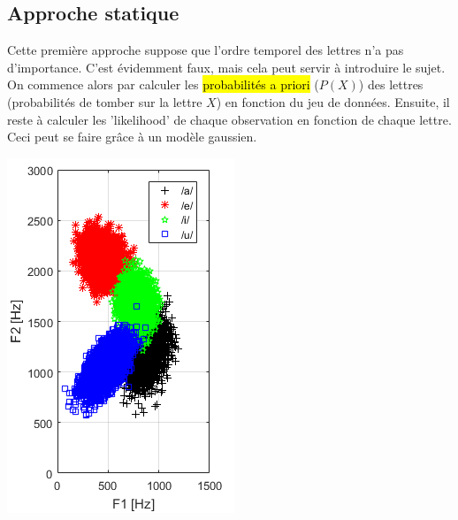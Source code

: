 \documentclass[letterpaper, 12pt]{article}
\newcommand{\alinea}{
\hspace*{0.5cm}}
\begin{document}
		\subsection{Approche statique}
			\begin{minipage}{0.75\textwidth}
				\alinea Cette première approche suppose que l'ordre temporel des lettres n'a pas d'importance. C'est évidemment faux,
				mais cela peut servir à introduire le sujet. On commence alors par calculer les \hl{probabilités a priori} ($P(X)$) des
				lettres (probabilités de tomber sur la lettre $X$) en fonction du jeu de données. Ensuite, il reste à calculer les 
				'likelihood' de chaque observation en fonction de chaque lettre. Ceci peut se faire grâce à un modèle gaussien.
			\end{minipage}\hfill
			\begin{minipage}{0.2\textwidth}
				\begin{center}
					\includegraphics[width=\textwidth]{Images/dictation-formants}
				\end{center}
			\end{minipage}
\end{document}

